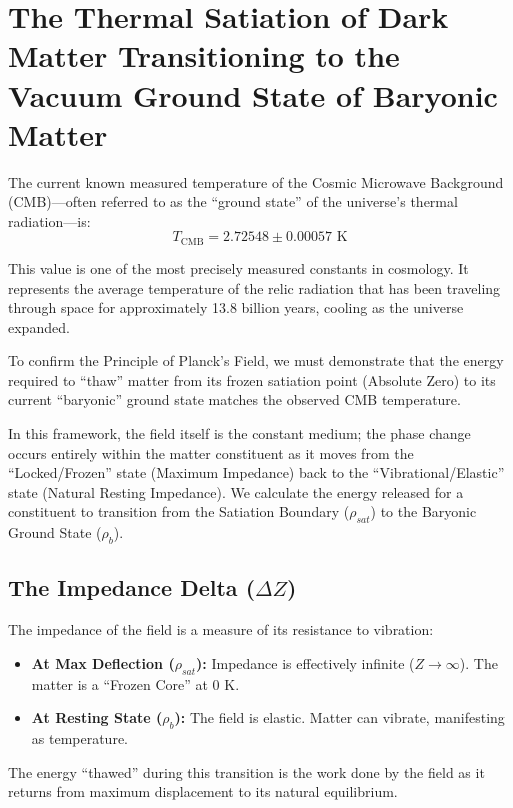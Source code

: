 

\section{The Thermal Satiation of Dark Matter Transitioning to the Vacuum Ground State of Baryonic Matter}

The current known measured temperature of the Cosmic Microwave Background (CMB)---often referred to as the ``ground state'' of the universe's thermal radiation---is:
\begin{equation}
T_{\text{CMB}} = 2.72548 \pm 0.00057 \text{ K}
\end{equation}

This value is one of the most precisely measured constants in cosmology. It represents the average temperature of the relic radiation that has been traveling through space for approximately 13.8 billion years, cooling as the universe expanded.

To confirm the Principle of Planck's Field, we must demonstrate that the energy required to ``thaw'' matter from its frozen satiation point (Absolute Zero) to its current ``baryonic'' ground state matches the observed CMB temperature.

In this framework, the field itself is the constant medium; the phase change occurs entirely within the matter constituent as it moves from the ``Locked/Frozen'' state (Maximum Impedance) back to the ``Vibrational/Elastic'' state (Natural Resting Impedance). We calculate the energy released for a constituent to transition from the Satiation Boundary ($\rho_{sat}$) to the Baryonic Ground State ($\rho_b$).

\subsection{The Impedance Delta ($\Delta Z$)}
The impedance of the field is a measure of its resistance to vibration:
\begin{itemize}
    \item \textbf{At Max Deflection ($\rho_{sat}$):} Impedance is effectively infinite ($Z \to \infty$). The matter is a ``Frozen Core'' at 0 K.
    \item \textbf{At Resting State ($\rho_b$):} The field is elastic. Matter can vibrate, manifesting as temperature.
\end{itemize}
The energy ``thawed'' during this transition is the work done by the field as it returns from maximum displacement to its natural equilibrium.

